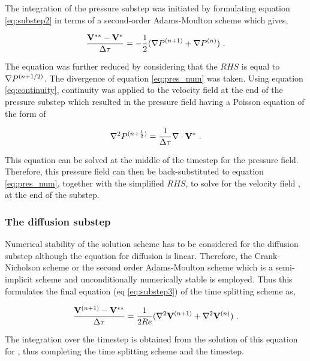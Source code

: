 The integration of the pressure substep was initiated by formulating equation \ref{eq:substep2} in terms of a second-order Adams-Moulton scheme which gives,
 
\begin{equation} \centering
\label{eq:pres_num}
\frac{\Vintint - \Vint}{\Delta\tau} = -\frac{1}{2}(\grad\Pres^{(n+1)} + \grad\Pres^{(n)}) ~.
\end{equation}

The equation was further reduced by considering that the $RHS$ is equal to $\nabla P^{(n+1/2)}$. The divergence of equation \ref{eq:pres_num} was taken. Using equation \ref{eq:continuity}, continuity was applied to the velocity field at the end of the pressure substep which resulted in the pressure field having a Poisson equation of the form of 

\begin{equation} \centering
\label{eq:poisson}
\gradsq\Pres^{(n+\frac{1}{2})} = \frac{1}{\Delta\tau}\divergence{\Vint} ~.
\end{equation} 

This equation can be solved at the middle of the timestep for the pressure field. Therefore, this pressure field can then be back-substituted to equation \ref{eq:pres_num}, together with the simplified $RHS$, to solve for the velocity field \Vintint, at the end of the substep. 

\subsubsection{The diffusion substep}

Numerical stability of the solution scheme has to be considered for the diffusion substep although the equation for diffusion is linear. Therefore, the Crank-Nicholson scheme or the second order Adams-Moulton scheme which is a semi-implicit scheme and unconditionally numerically stable is employed. Thus this formulates the final equation (eq \ref{eq:substep3}) of the time splitting scheme as,

\begin{equation} \centering
\label{eq:diff_num}
\frac{\Vnext - \Vintint}{\Delta\tau} = \frac{1}{2\reynoldsnumber}(\gradsq{\Vnext} + \gradsq{\vecV^{(n)}}) ~.
\end{equation}

The integration over the timestep is obtained from the solution of this equation  for \Vnext, thus completing the time splitting scheme and the timestep.


